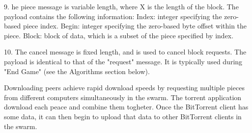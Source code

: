 \documentclass[11pt]{article}
\begin{document}
  \begin{flushleft}

    9. he piece message is variable length, where X is the length of the block. The payload contains the following information: Index: integer specifying the zero-based piece index. Begin: integer specifying the zero-based byte offset within the piece. Block: block of data, which is a subset of the piece specified by index.

  \end{flushleft}
  \begin{flushleft}

    10. The cancel message is fixed length, and is used to cancel block requests. The payload is identical to that of the "request" message. It is typically used during "End Game" (see the Algorithms section below).

  \end{flushleft}
  \begin{flushleft}

    Downloading peers achieve rapid download speeds by requesting multiple pieces from different computers simultaneously in the swarm.
    The torrent application download each peace and combine them togheter. Once the BitTorrent client has some data, it can then begin to upload that data to other BitTorrent clients in the swarm.

  \end{flushleft}
  \begin{flushleft}
  \end{flushleft}
\end{document}
